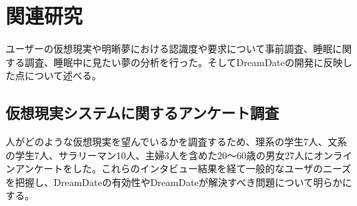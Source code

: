 \chapter{関連研究}
\label{chap:webapi}

 ユーザーの仮想現実や明晰夢における認識度や要求について事前調査、睡眠に関する調査、睡眠中に見たい夢の分析を行った。そしてDreamDateの開発に反映した点について述べる。

\section{仮想現実システムに関するアンケート調査}
人がどのような仮想現実を望んでいるかを調査するため、理系の学生7人、文系の学生7人、サラリーマン10人、主婦3人を含めた20〜60歳の男女27人にオンラインアンケートをした。これらのインタビュー結果を経て一般的なユーザのニーズを把握し、DreamDateの有効性やDreamDateが解決すべき問題について明らかにする。





